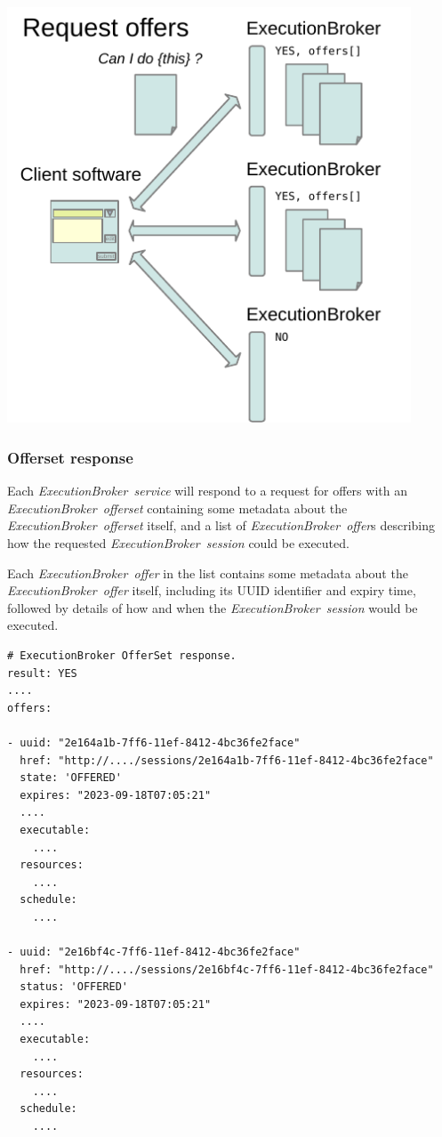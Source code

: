\documentclass[11pt,a4paper]{ivoa}
\newcommand{\execbrokerservice}[1] {\textit{ExecutionBroker~service#1}}
\newcommand{\execoffer}[1] {\textit{ExecutionBroker~offer#1}}
\newcommand{\execofferset}[1] {\textit{ExecutionBroker~offerset#1}}
\newcommand{\execsession}[1] {\textit{ExecutionBroker~session#1}}
\begin{document}
\includegraphics[width=0.9\textwidth]{diagrams/request-offers.pdf}

\subsubsection{Offerset response}
\label{offerset-response}

Each \execbrokerservice{} will respond to a request for offers with an \execofferset{}
containing some metadata about the \execofferset{} itself, and a list of \execoffer{}s
describing how the requested \execsession{} could be executed.

Each \execoffer{} in the list contains some metadata about the \execoffer{} itself,
including its UUID identifier and expiry time, followed by details of how and when the
\execsession{} would be executed.

\begin{lstlisting}[]
# ExecutionBroker OfferSet response.
result: YES
....
offers:

- uuid: "2e164a1b-7ff6-11ef-8412-4bc36fe2face"
  href: "http://..../sessions/2e164a1b-7ff6-11ef-8412-4bc36fe2face"
  state: 'OFFERED'
  expires: "2023-09-18T07:05:21"
  ....
  executable:
    ....
  resources:
    ....
  schedule:
    ....

- uuid: "2e16bf4c-7ff6-11ef-8412-4bc36fe2face"
  href: "http://..../sessions/2e16bf4c-7ff6-11ef-8412-4bc36fe2face"
  status: 'OFFERED'
  expires: "2023-09-18T07:05:21"
  ....
  executable:
    ....
  resources:
    ....
  schedule:
    ....
\end{lstlisting}
\end{document}
